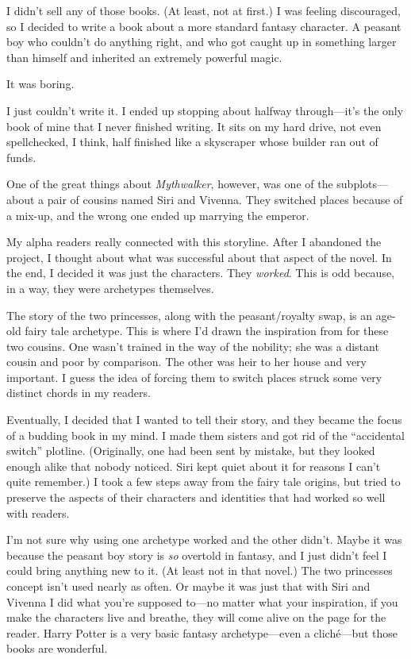 I didn’t sell any of those books. (At least, not at first.) I was feeling discouraged, so I decided to write a book about a more standard fantasy character. A peasant boy who couldn’t do anything right, and who got caught up in something larger than himself and inherited an extremely powerful magic.

It was boring.

I just couldn’t write it. I ended up stopping about halfway through—it’s the only book of mine that I never finished writing. It sits on my hard drive, not even spellchecked, I think, half finished like a skyscraper whose builder ran out of funds.

One of the great things about \textit{Mythwalker}, however, was one of the subplots—about a pair of cousins named Siri and Vivenna. They switched places because of a mix-up, and the wrong one ended up marrying the emperor.

My alpha readers really connected with this storyline. After I abandoned the project, I thought about what was successful about that aspect of the novel. In the end, I decided it was just the characters. They \textit{worked}. This is odd because, in a way, they were archetypes themselves.

The story of the two princesses, along with the peasant/royalty swap, is an age-old fairy tale archetype. This is where I’d drawn the inspiration from for these two cousins. One wasn’t trained in the way of the nobility; she was a distant cousin and poor by comparison. The other was heir to her house and very important. I guess the idea of forcing them to switch places struck some very distinct chords in my readers.

Eventually, I decided that I wanted to tell their story, and they became the focus of a budding book in my mind. I made them sisters and got rid of the “accidental switch” plotline. (Originally, one had been sent by mistake, but they looked enough alike that nobody noticed. Siri kept quiet about it for reasons I can’t quite remember.) I took a few steps away from the fairy tale origins, but tried to preserve the aspects of their characters and identities that had worked so well with readers.

I’m not sure why using one archetype worked and the other didn’t. Maybe it was because the peasant boy story is \textit{so} overtold in fantasy, and I just didn’t feel I could bring anything new to it. (At least not in that novel.) The two princesses concept isn’t used nearly as often. Or maybe it was just that with Siri and Vivenna I did what you’re supposed to—no matter what your inspiration, if you make the characters live and breathe, they will come alive on the page for the reader. Harry Potter is a very basic fantasy archetype—even a cliché—but those books are wonderful.

